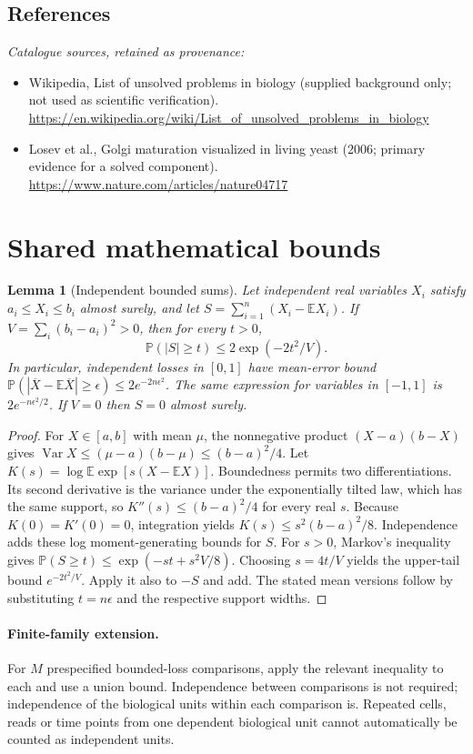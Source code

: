 \documentclass[11pt]{article}
\newcommand{\E}{\mathbb E}
\newcommand{\Prob}{\mathbb P}
\DeclareMathOperator{\Var}{Var}
\providecommand{\E}{\mathbb E}
\providecommand{\Prob}{\mathbb P}
\providecommand{\Var}{\operatorname{Var}}
\newtheorem{sharedlemma}{Lemma}[section]
\begin{document}
\subsection{References}
\noindent\emph{Catalogue sources, retained as provenance:}
\begin{itemize}
\item Wikipedia, List of unsolved problems in biology (supplied background only; not used as scientific verification). \url{https://en.wikipedia.org/wiki/List_of_unsolved_problems_in_biology}
\item Losev et al., Golgi maturation visualized in living yeast (2006; primary evidence for a solved component). \url{https://www.nature.com/articles/nature04717}
\end{itemize}
\clearpage


\appendix
\section{Shared mathematical bounds}\label{app:bounds}
\begin{sharedlemma}[Independent bounded sums]\label{lem:bounded}
Let independent real variables $X_i$ satisfy $a_i\leq X_i\leq b_i$ almost surely,
and let $S=\sum_{i=1}^n(X_i-\E X_i)$. If
$V=\sum_i(b_i-a_i)^2>0$, then for every $t>0$,
\[
 \Prob(|S|\geq t)\leq 2\exp(-2t^2/V).
\]
In particular, independent losses in $[0,1]$ have mean-error bound
$\Prob(|\overline X-\E\overline X|\geq\epsilon)
\leq2e^{-2n\epsilon^2}$. The same expression for variables in $[-1,1]$
is $2e^{-n\epsilon^2/2}$. If $V=0$ then $S=0$ almost surely.
\end{sharedlemma}
\begin{proof}
For $X\in[a,b]$ with mean $\mu$, the nonnegative product
$(X-a)(b-X)$ gives
$\Var X\leq(\mu-a)(b-\mu)\leq(b-a)^2/4$.
Let $K(s)=\log\E\exp[s(X-\E X)]$.
Boundedness permits two differentiations. Its second derivative is the variance
under the exponentially tilted law, which has the same support, so
$K''(s)\leq(b-a)^2/4$ for every real $s$.
Because $K(0)=K'(0)=0$, integration yields
$K(s)\leq s^2(b-a)^2/8$.
Independence adds these log moment-generating bounds for $S$.
For $s>0$, Markov's inequality gives
$\Prob(S\geq t)\leq\exp(-st+s^2V/8)$.
Choosing $s=4t/V$ yields the upper-tail bound $e^{-2t^2/V}$.
Apply it also to $-S$ and add. The stated mean versions follow by substituting
$t=n\epsilon$ and the respective support widths.
\end{proof}

\paragraph{Finite-family extension.}
For $M$ prespecified bounded-loss comparisons, apply the relevant inequality to
each and use a union bound. Independence between comparisons is not required;
independence of the biological units within each comparison is. Repeated cells,
reads or time points from one dependent biological unit cannot automatically be
counted as independent units.
\end{document}

